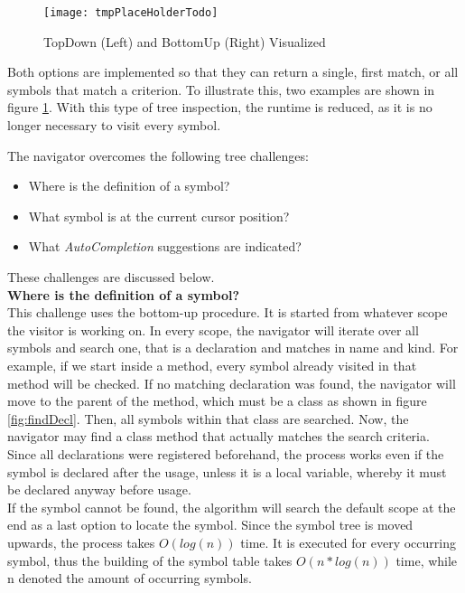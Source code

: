 \begin{figure}[H]
    \centering
    \texttt{[image: tmpPlaceHolderTodo]}
    \caption{TopDown (Left) and BottomUp (Right) Visualized}
    \label{fig:impl_symboltablenav}
\end{figure}

Both options are implemented so that they can return a single, first match, or all symbols that match a criterion.
To illustrate this, two examples are shown in figure \ref{fig:impl_symboltablenav}.
With this type of tree inspection, the runtime is reduced, as it is no longer necessary to visit every symbol.

The navigator overcomes the following tree challenges:
\begin{itemize}
    \item Where is the definition of a symbol?
    \item What symbol is at the current cursor position?
    \item What \textit{AutoCompletion} suggestions are indicated?
\end{itemize}
These challenges are discussed below. \\

\textbf{Where is the definition of a symbol?}\\
This challenge uses the bottom-up procedure.
It is started from whatever scope the visitor is working on.
In every scope, the navigator will iterate over all symbols and search one, that is a declaration and matches in name and kind.
For example, if we start inside a method, every symbol already visited in that method will be checked.
If no matching declaration was found, the navigator will move to the parent of the method, which must be a class
as shown in figure \ref{fig:findDecl}.
Then, all symbols within that class are searched.
Now, the navigator may find a class method that actually matches the search criteria.
Since all declarations were registered beforehand,
the process works even if the symbol is declared after the usage,
unless it is a local variable,
whereby it must be declared anyway before usage.\\

If the symbol cannot be found, the algorithm will search the default scope at the end as a last option to locate the symbol.
Since the symbol tree is moved upwards, the process takes $O(log(n))$ time.
It is executed for every occurring symbol, thus the building of the symbol table takes $O(n*log(n))$ time, while n denoted the amount of occurring symbols.\\

